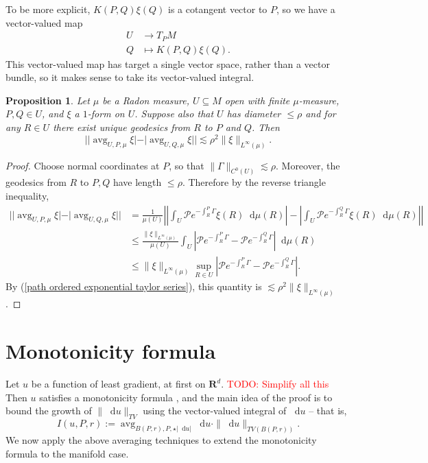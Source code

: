 \documentclass[reqno,11pt]{amsart}
\newcommand{\RR}{\mathbf{R}}
\DeclareMathOperator{\avg}{avg}
\newcommand*\dif{\mathop{}\!\mathrm{d}}
\newtheorem{proposition}[theorem]{Proposition}
\theoremstyle{definition}
\numberwithin{equation}{section}
\newcommand\todo[1]{\textcolor{red}{TODO: #1}}
\begin{document}
To be more explicit, $K(P, Q)\xi(Q)$ is a cotangent vector to $P$, so we have a vector-valued map 
\begin{align*}
U &\to T_PM \\
Q &\mapsto K(P, Q)\xi(Q).
\end{align*}
This vector-valued map has target a single vector space, rather than a vector bundle, so it makes sense to take its vector-valued integral.

\begin{proposition}\label{translation invariance}
Let $\mu$ be a Radon measure, $U \subseteq M$ open with finite $\mu$-measure, $P, Q \in U$, and $\xi$ a $1$-form on $U$.
Suppose also that $U$ has diameter $\leq \rho$ and for any $R \in U$ there exist unique geodesics from $R$ to $P$ and $Q$.
Then 
$$||\avg_{U, P, \mu} \xi| - |\avg_{U, Q, \mu} \xi|| \lesssim \rho^2 \|\xi\|_{L^\infty(\mu)}.$$
\end{proposition}
\begin{proof}
Choose normal coordinates at $P$, so that $\|\Gamma\|_{C^0(U)} \lesssim \rho$.
Moreover, the geodesics from $R$ to $P, Q$ have length $\leq \rho$.
Therefore by the reverse triangle inequality,
\begin{align*}
||\avg_{U, P, \mu} \xi| - |\avg_{U, Q, \mu} \xi||
&= \frac{1}{\mu(U)} \left|\left|\int_U \mathcal P e^{-\int_R^P \Gamma} \xi(R) \dif \mu(R)\right| - \left|\int_U \mathcal P e^{-\int_R^Q \Gamma} \xi(R) \dif \mu(R)\right|\right| \\
&\leq \frac{\|\xi\|_{L^\infty(\mu)}}{\mu(U)} \int_U \left|\mathcal P e^{-\int_R^P \Gamma} - \mathcal Pe^{-\int_R^Q \Gamma}\right| \dif \mu(R) \\
&\leq \|\xi\|_{L^\infty(\mu)} \sup_{R \in U} \left|\mathcal Pe^{-\int_R^P \Gamma} - \mathcal Pe^{-\int_R^Q \Gamma}\right|.
\end{align*}
By (\ref{path ordered exponential taylor series}), this quantity is $\lesssim \rho^2 \|\xi\|_{L^\infty(\mu)}$.
\end{proof}


\section{Monotonicity formula}\label{MollifierSection}
Let $u$ be a function of least gradient, at first on $\RR^d$. \todo{Simplify all this}
Then $u$ satisfies a monotonicity formula \cite[Theorem 5.12]{Giusti77}, and the main idea of the proof is to bound the growth of $\|\dif u\|_{TV}$ using the vector-valued integral of $\dif u$ -- that is,
\begin{equation}\label{integral of du}
I(u, P, r) := \avg_{B(P, r), P, \star |\dif u|} \dif u \cdot \|\dif u\|_{TV(B(P, r))}.
\end{equation}
We now apply the above averaging techniques to extend the monotonicity formula to the manifold case.
\end{document}
